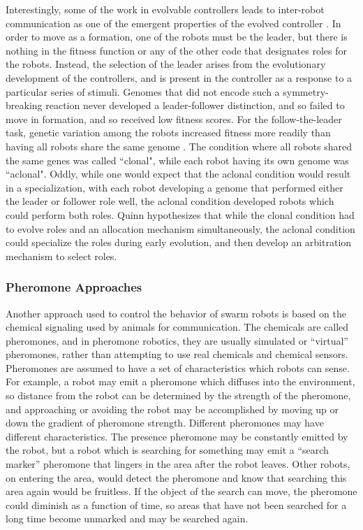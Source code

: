 \documentclass[]{article}
\begin{document}
Interestingly, some of the work in evolvable controllers leads to inter-robot communication as one of the emergent properties of the evolved controller \cite{quinn2001evolving}.
In order to move as a formation, one of the robots must be the leader, but there is nothing in the fitness function or any of the other code that designates roles for the robots. 
Instead, the selection of the leader arises from the evolutionary development of the controllers, and is present in the controller as a response to a particular series of stimuli. 
Genomes that did not encode such a symmetry-breaking reaction never developed a leader-follower distinction, and so failed to move in formation, and so received low fitness scores. 
For the follow-the-leader task, genetic variation among the robots increased fitness more readily than having all robots share the same genome \cite{quinn2001comparison}.
The condition where all robots shared the same genes was called ``clonal", while each robot having its own genome was ``aclonal".
Oddly, while one would expect that the aclonal condition would result in a specialization, with each robot developing a genome that performed either the leader or follower role well, the aclonal condition developed robots which could perform both roles. 
Quinn hypothesizes that while the clonal condition had to evolve roles and an allocation mechanism simultaneously, the aclonal condition could specialize the roles during early evolution, and then develop an arbitration mechanism to select roles.

\subsubsection{Pheromone Approaches}

Another approach used to control the behavior of swarm robots is based on the chemical signaling used by animals for communication. 
The chemicals are called pheromones, and in pheromone robotics, they are usually simulated or ``virtual'' pheromones, rather than attempting to use real chemicals and chemical sensors. 
Pheromones are assumed to have a set of characteristics which robots can sense. 
For example, a robot may emit a pheromone which diffuses into the environment, so distance from the robot can be determined by the strength of the pheromone, and approaching or avoiding the robot may be accomplished by moving up or down the gradient of pheromone strength. 
Different pheromones may have different characteristics. 
The presence pheromone may be constantly emitted by the robot, but a robot which is searching for something may emit a ``search marker'' pheromone that lingers in the area after the robot leaves. 
Other robots, on entering the area, would detect the pheromone and know that searching this area again would be fruitless. 
If the object of the search can move, the pheromone could diminish as a function of time, so areas that have not been searched for a long time become unmarked and may be searched again. 
\end{document}
